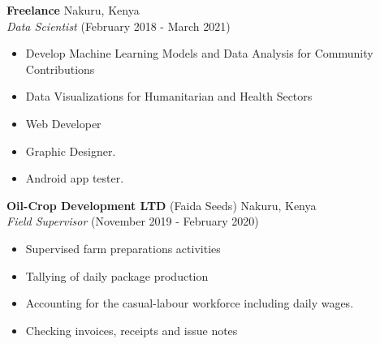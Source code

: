 \documentclass[line,margin,10pt]{res}
\begin{document}
\begin{resume}
\begin{itemize}
\end{itemize}

\textbf{Freelance} \hfill Nakuru, Kenya\\
{\sl Data Scientist} \hfill (February 2018 - March 2021)
\begin{itemize} \itemsep -2pt
    \item Develop Machine Learning Models and Data Analysis for Community Contributions
    \item Data Visualizations for Humanitarian and Health Sectors
    \item Web Developer
    \item Graphic Designer.
    \item Android app tester.
\end{itemize}

\textbf{Oil-Crop Development LTD} (Faida Seeds) \hfill Nakuru, Kenya\\
{\sl Field Supervisor} \hfill (November 2019 - February 2020)
\begin{itemize} \itemsep -2pt
    \item Supervised farm preparations activities
    \item Tallying of daily package production
    \item Accounting for the casual-labour workforce including daily wages.
    \item Checking invoices, receipts and issue notes
\end{itemize}
{\vspace{-0.25cm}}


\end{resume}
\end{document}
